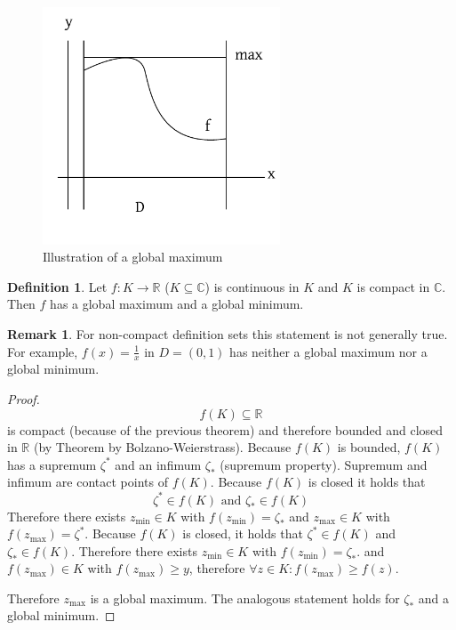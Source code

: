 \documentclass[a4paper,landscape,twocolumn]{article}
\theoremstyle{definition}
\newtheorem{defi}{Definition}
\newtheorem{rem}{Remark}
\begin{document}
\begin{figure}[!h]
  \begin{center}
    \includegraphics[width=200pt]{img/global_maximum.pdf}
    \caption{Illustration of a global maximum}
  \end{center}
\end{figure}

\begin{defi}
  Let $f: K \to \mathbb R$ ($K \subseteq \mathbb C$) is continuous in $K$
  and $K$ is compact in $\mathbb C$. Then $f$ has a global maximum and a global
  minimum.
\end{defi}

\begin{rem}
  For non-compact definition sets this statement is not generally true.
  For example, $f(x) = \frac1x$ in $D = (0, 1)$ has neither a global maximum
  nor a global minimum.
\end{rem}
\begin{proof}
  \[ f(K) \subseteq \mathbb R \]
  is compact (because of the previous theorem) and therefore bounded and
  closed in $\mathbb R$ (by Theorem by Bolzano-Weierstrass).
  Because $f(K)$ is bounded, $f(K)$ has a supremum $\zeta^*$ and an infimum $\zeta_*$
  (supremum property). Supremum and infimum are contact points of $f(K)$.
  Because $f(K)$ is closed it holds that
  \[ \zeta^* \in f(K) \text{ and } \zeta_* \in f(K) \]
  Therefore there exists $z_{\text{min}} \in K$ with $f(z_{\text{min}}) = \zeta_*$
  and $z_{\text{max}} \in K$ with $f(z_{\text{max}}) = \zeta^*$.
  Because $f(K)$ is closed, it holds that $\zeta^* \in f(K)$ and $\zeta_* \in f(K)$.
  Therefore there exists $z_{\text{min}} \in K$ with $f(z_{\text{min}}) = \zeta_*$.
  and $f(z_{\text{max}}) \in K$ with $f(z_{\text{max}}) \geq y$, therefore
  $\forall z \in K: f(z_{\text{max}}) \geq f(z)$.

  Therefore $z_{\text{max}}$ is a global maximum. The analogous statement holds
  for $\zeta_*$ and a global minimum.
\end{proof}
\end{document}
